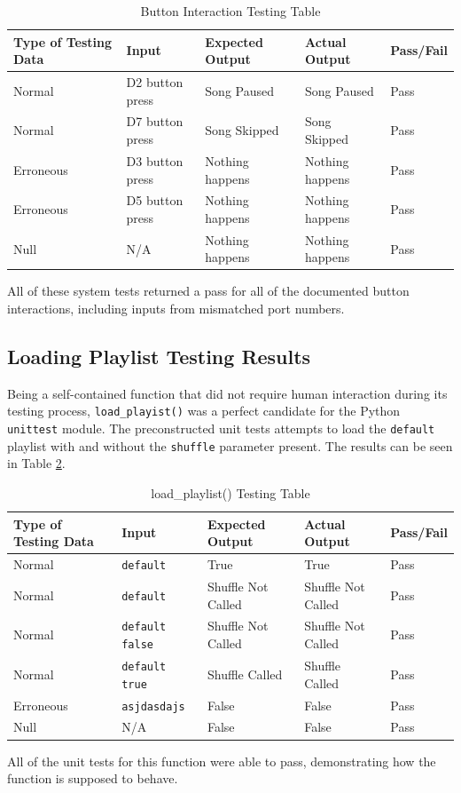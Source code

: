 \begin{table}[H]
  \centering
  \caption{Button Interaction Testing Table}
  \label{tab:buttonResults}
  \begin{tabular}{lllll}
    \toprule
    Type of Testing Data & Input & Expected Output & Actual Output & Pass/Fail \\
    \midrule
    Normal & D2 button press & Song Paused & Song Paused & Pass \\
    Normal & D7 button press & Song Skipped & Song Skipped & Pass \\
    Erroneous & D3 button press & Nothing happens & Nothing happens & Pass \\
    Erroneous & D5 button press & Nothing happens & Nothing happens & Pass \\
    Null & N/A & Nothing happens & Nothing happens & Pass \\
    \bottomrule
  \end{tabular}
\end{table}
All of these system tests returned a pass for all of the documented button interactions, including inputs from mismatched port numbers. 

\subsection{Loading Playlist Testing Results}\label{subsec:playlistResults}
Being a self-contained function that did not require human interaction during its testing process, \texttt{load\_playist()} was a perfect candidate for the Python \texttt{unittest} module. The preconstructed unit tests attempts to load the \texttt{default} playlist with and without the \texttt{shuffle} parameter present. The results can be seen in Table \ref{tab:loadPlaylistTest}.
\begin{table}[H]
  \centering
  \caption{load\_playlist() Testing Table}
  \label{tab:loadPlaylistTest}
  \begin{tabular}{lllll}
    \toprule
    Type of Testing Data & Input & Expected Output & Actual Output & Pass/Fail \\
    \midrule
    Normal & \texttt{default} & True & True & Pass \\
    Normal & \texttt{default} & Shuffle Not Called & Shuffle Not Called & Pass \\
    Normal & \texttt{default false} & Shuffle Not Called & Shuffle Not Called & Pass \\
    Normal & \texttt{default true} & Shuffle Called & Shuffle Called & Pass \\
    Erroneous & \texttt{asjdasdajs} & False & False & Pass \\
    Null & N/A & False & False & Pass \\
    \bottomrule
  \end{tabular}
\end{table}
All of the unit tests for this function were able to pass, demonstrating how the function is supposed to behave. 
